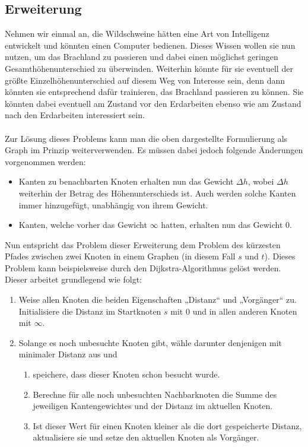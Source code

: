 \documentclass[a4paper, notitlepage, 12pt]{scrartcl}
\begin{document}
\subsection{Erweiterung}
Nehmen wir einmal an, die Wildschweine hätten eine Art von Intelligenz entwickelt und könnten einen Computer bedienen. Dieses Wissen wollen sie nun nutzen, um das Brachland zu passieren und dabei einen möglichst geringen Gesamthöhenunterschied zu überwinden. Weiterhin könnte für sie eventuell der größte Einzelhöhenunterschied auf diesem Weg von Interesse sein, denn dann könnten sie entsprechend dafür trainieren, das Brachland passieren zu können. Sie könnten dabei eventuell am Zustand vor den Erdarbeiten ebenso wie am Zustand nach den Erdarbeiten interessiert sein.\\ \\
Zur Lösung dieses Problems kann man die oben dargestellte Formulierung als Graph im Prinzip weiterverwenden. Es müssen dabei jedoch folgende Änderungen vorgenommen werden:
\begin{itemize}
\item Kanten zu benachbarten Knoten erhalten nun das Gewicht $\Delta h$, wobei $\Delta h$ weiterhin der Betrag des Höhenunterschieds ist. Auch werden solche Kanten immer hinzugefügt, unabhängig von ihrem Gewicht.
\item Kanten, welche vorher das Gewicht $\infty$ hatten, erhalten nun das Gewicht $0$.
\end{itemize}
Nun entspricht das Problem dieser Erweiterung dem Problem des kürzesten Pfades zwischen zwei Knoten in einem Graphen (in diesem Fall $s$ und $t$). Dieses Problem kann beispielsweise durch den Dijkstra-Algorithmus gelöst werden. Dieser arbeitet grundlegend wie folgt:
\begin{enumerate}
\item Weise allen Knoten die beiden Eigenschaften „Distanz“ und „Vorgänger“ zu. Initialisiere die Distanz im Startknoten $s$ mit 0 und in allen anderen Knoten mit $\infty$.
\item Solange es noch unbesuchte Knoten gibt, wähle darunter denjenigen mit minimaler Distanz aus und
\begin{enumerate}
\item speichere, dass dieser Knoten schon besucht wurde.
\item Berechne für alle noch unbesuchten Nachbarknoten die Summe des jeweiligen Kantengewichtes und der Distanz im aktuellen Knoten.
\item Ist dieser Wert für einen Knoten kleiner als die dort gespeicherte Distanz, aktualisiere sie und setze den aktuellen Knoten als Vorgänger.
\end{enumerate}
\end{enumerate}
\end{document}
